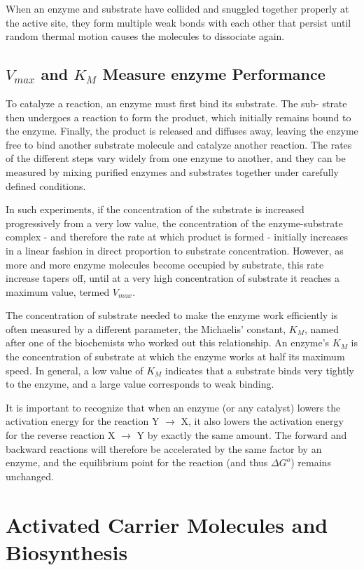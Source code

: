 When an enzyme and substrate have collided and snuggled together
properly at the active site, they form multiple weak bonds with each
other that persist until random thermal motion causes the molecules to
dissociate again.

\subsection{$V_{max}$ and $K_{M}$ Measure enzyme Performance}

To catalyze a reaction, an enzyme must first bind its substrate. The sub-
strate then undergoes a reaction to form the product, which initially
remains bound to the enzyme. Finally, the product is released and diffuses
away, leaving the enzyme free to bind another substrate molecule
and catalyze another reaction. The rates of the different
steps vary widely from one enzyme to another, and they can be measured
by mixing purified enzymes and substrates together under carefully
defined conditions.

In such experiments, if the concentration of the substrate is increased
progressively from a very low value, the concentration of the enzyme-substrate
complex - and therefore the rate at which product is formed - initially increases
in a linear fashion in direct proportion to substrate concentration.
However, as more and more enzyme molecules become occupied by substrate,
this rate increase tapers off, until at a very high concentration of substrate
it reaches a maximum value, termed $V_{max}$.

The concentration of substrate needed to make the enzyme work efficiently
is often measured by a different parameter, the Michaelis’ constant,
$K_M$, named after one of the biochemists who worked out this relationship.
An enzyme’s $K_M$ is the concentration of substrate at which the enzyme
works at half its maximum speed. In general, a low
value of $K_M$ indicates that a substrate binds very tightly to the enzyme,
and a large value corresponds to weak binding.

It is important to recognize that when an enzyme (or any catalyst) lowers
the activation energy for the reaction Y $\rightarrow$ X, it also lowers the activation
energy for the reverse reaction X $\rightarrow$ Y by exactly the same amount.
The forward and backward reactions will therefore be accelerated by the same factor
by an enzyme, and the equilibrium point for the reaction (and thus $\Delta G^{o}$)
remains unchanged.

\section{Activated Carrier Molecules and Biosynthesis}

